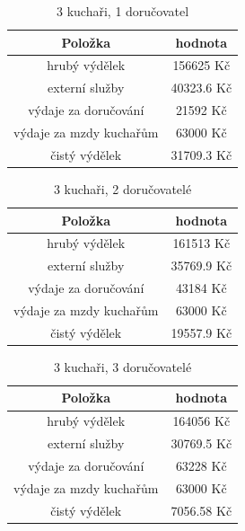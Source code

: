 \documentclass[a4paper, 11pt]{article}
\begin{document}
\begin{table}[h]
\centering
\begin{tabular}{cc}
\textbf{Položka} & \textbf{hodnota}                                                                                   \\ \hline
hrubý výdělek & 156625 Kč \\ \hline
externí služby  & 40323.6 Kč \\ \hline
výdaje za doručování &  21592 Kč \\ \hline
výdaje za mzdy kuchařům &  63000 Kč \\ \hline
čistý výdělek & 31709.3 Kč
\end{tabular}
\caption{3 kuchaři, 1 doručovatel}
\label{tab:5}
\end{table}

\begin{table}[h]
\centering
\begin{tabular}{cc}
\textbf{Položka} & \textbf{hodnota}                                                                                   \\ \hline
hrubý výdělek & 161513 Kč \\ \hline
externí služby  & 35769.9 Kč \\ \hline
výdaje za doručování &  43184 Kč \\ \hline
výdaje za mzdy kuchařům &  63000 Kč \\ \hline
čistý výdělek &  19557.9 Kč \\ \hline
\end{tabular}
\caption{3 kuchaři, 2 doručovatelé}
\label{tab:6}
\end{table}

\begin{table}[h]
\centering
\begin{tabular}{cc}
\textbf{Položka} & \textbf{hodnota}                                                                                   \\ \hline
hrubý výdělek & 164056 Kč \\ \hline
externí služby  & 30769.5 Kč \\ \hline
výdaje za doručování &  63228 Kč \\ \hline
výdaje za mzdy kuchařům &  63000 Kč \\ \hline
čistý výdělek &  7056.58 Kč \\ \hline
\end{tabular}
\caption{3 kuchaři, 3 doručovatelé}
\end{table}
\end{document}
